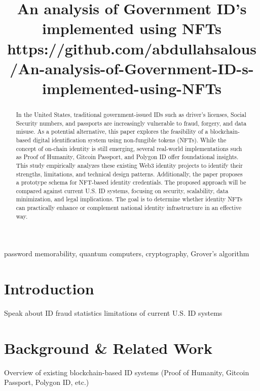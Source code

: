 \documentclass[conference]{IEEEtran}
\begin{document}
\title {An analysis of Government ID’s implemented using NFTs \\[1ex] \large https://github.com/abdullahsalous/An-analysis-of-Government-ID-s-implemented-using-NFTs}

\author{
}

\maketitle

\begin{abstract}
In the United States, traditional government-issued IDs such as driver's licenses, Social Security numbers, and passports are increasingly vulnerable to fraud, forgery, and data misuse. As a potential alternative, this paper explores the feasibility of a blockchain-based digital identification system using non-fungible tokens (NFTs). While the concept of on-chain identity is still emerging, several real-world implementations such as Proof of Humanity, Gitcoin Passport, and Polygon ID offer foundational insights. This study empirically analyzes these existing Web3 identity projects to identify their strengths, limitations, and technical design patterns. Additionally, the paper proposes a prototype schema for NFT-based identity credentials. The proposed approach will be compared against current U.S. ID systems, focusing on security, scalability, data minimization, and legal implications. The goal is to determine whether identity NFTs can practically enhance or complement national identity infrastructure in an effective way.
\end{abstract}

\begin{IEEEkeywords}
password memorability, quantum computers, cryptography, Grover's algorithm
\end{IEEEkeywords}

\section{Introduction}
Speak about ID fraud statistics
limitations of current U.S. ID systems

\section{Background \& Related Work}
Overview of existing blockchain-based ID systems (Proof of Humanity, Gitcoin Passport, Polygon ID, etc.)
\end{document}
